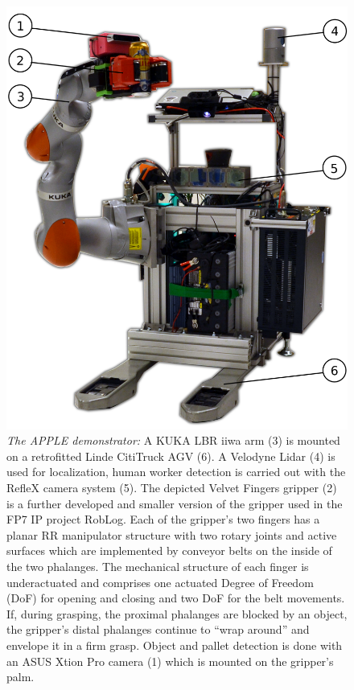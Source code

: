 \begin{figure}[t!]
\begin{center}
\includegraphics[width =0.8\linewidth]{figs/apple_demonstrator}
\caption{\textit{The APPLE demonstrator:} A KUKA LBR iiwa arm (3) is mounted on a retrofitted Linde
  CitiTruck AGV (6). A Velodyne Lidar (4) is used for localization, human worker detection is
  carried out with the RefleX camera system (5). The depicted Velvet Fingers gripper (2) is a further
  developed and smaller version of the gripper used in the FP7 IP project RobLog. Each of the
  gripper’s two fingers has a planar RR manipulator structure with two rotary joints and active
  surfaces which are implemented by conveyor belts on the inside of the two phalanges. The
  mechanical structure of each finger is underactuated and comprises one actuated Degree of Freedom
  (DoF) for opening and closing and two DoF for the belt movements. If, during grasping, the
  proximal phalanges are blocked by an object, the gripper’s distal phalanges continue to “wrap
  around” and envelope it in a firm grasp. Object and pallet detection is done with an ASUS Xtion
  Pro camera (1) which is mounted on the gripper's palm.}
\label{fig:robot}
\vspace{-0.5cm}
\end{center}
\end{figure}
%